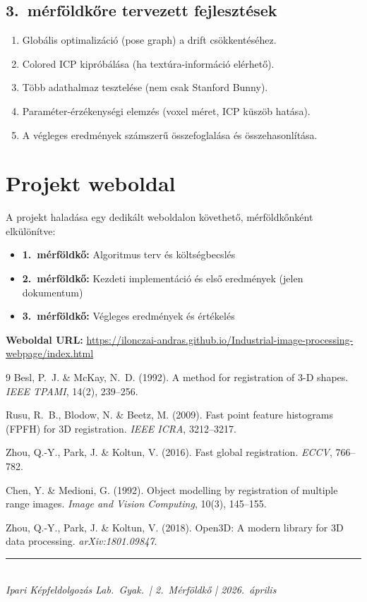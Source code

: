 \documentclass[12pt,a4paper]{article}
\begin{document}
\subsection{3.~mérföldkőre tervezett fejlesztések}

\begin{enumerate}[nosep]
    \item Globális optimalizáció (pose graph) a drift csökkentéséhez.
    \item Colored ICP kipróbálása (ha textúra-információ elérhető).
    \item Több adathalmaz tesztelése (nem csak Stanford Bunny).
    \item Paraméter-érzékenységi elemzés (voxel méret, ICP küszöb hatása).
    \item A végleges eredmények számszerű összefoglalása és összehasonlítása.
\end{enumerate}

\section{Projekt weboldal}

A projekt haladása egy dedikált weboldalon követhető, mérföldkőnként elkülönítve:

\begin{itemize}[nosep]
    \item \textbf{1.~mérföldkő:} Algoritmus terv és költségbecslés
    \item \textbf{2.~mérföldkő:} Kezdeti implementáció és első eredmények (jelen dokumentum)
    \item \textbf{3.~mérföldkő:} Végleges eredmények és értékelés
\end{itemize}

\textbf{Weboldal URL:} \url{https://ilonczai-andras.github.io/Industrial-image-processing-webpage/index.html}

\begin{thebibliography}{9}
Besl, P.~J. \& McKay, N.~D. (1992).
A method for registration of 3-D shapes.
\textit{IEEE TPAMI}, 14(2), 239--256.

Rusu, R.~B., Blodow, N. \& Beetz, M. (2009).
Fast point feature histograms (FPFH) for 3D registration.
\textit{IEEE ICRA}, 3212--3217.

Zhou, Q.-Y., Park, J. \& Koltun, V. (2016).
Fast global registration.
\textit{ECCV}, 766--782.

Chen, Y. \& Medioni, G. (1992).
Object modelling by registration of multiple range images.
\textit{Image and Vision Computing}, 10(3), 145--155.

Zhou, Q.-Y., Park, J. \& Koltun, V. (2018).
Open3D: A modern library for 3D data processing.
\textit{arXiv:1801.09847}.
\end{thebibliography}

\vfill
\noindent\rule{\textwidth}{0.4pt}\\
\small\textit{Ipari Képfeldolgozás Lab.\ Gyak.\ | 2.~Mérföldkő | 2026.~április}
\end{document}

